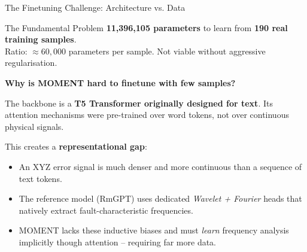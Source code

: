 \documentclass{beamer}
\begin{document}
\begin{frame}{The Finetuning Challenge: Architecture vs. Data}

    \begin{alertblock}{The Fundamental Problem}
        \textbf{11,396,105 parameters} to learn from \textbf{190 real training samples}.\\
        Ratio: $\approx 60,000$ parameters per sample. Not viable without aggressive regularisation.
    \end{alertblock}

    \vspace{0.4cm}
    \textbf{Why is MOMENT hard to finetune with few samples?}

    The backbone is a \textbf{T5 Transformer originally designed for text}. Its attention mechanisms were pre-trained over word tokens, not over continuous physical signals.

    \vspace{0.2cm}
    This creates a \textbf{representational gap}:
    \begin{itemize}
        \item An XYZ error signal is much denser and more continuous than a sequence of text tokens.
        \item The reference model (RmGPT) uses dedicated \textit{Wavelet + Fourier} heads that natively extract fault-characteristic frequencies.
        \item MOMENT lacks these inductive biases and must \textit{learn} frequency analysis implicitly though attention -- requiring far more data.
    \end{itemize}
\end{frame}
\end{document}
